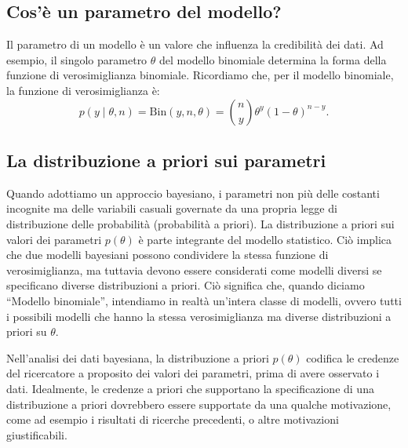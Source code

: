 \documentclass[
  11pt,
  italian,
  a4paper,
  extrafontsizes,onecolumn,openright
  ]{memoir}
\begin{document}
\hypertarget{cosuxe8-un-parametro-del-modello}{%
\subsection{Cos'è un parametro del modello?}\label{cosuxe8-un-parametro-del-modello}}

Il parametro di un modello è un valore che influenza la credibilità dei dati. Ad esempio, il singolo parametro \(\theta\) del modello binomiale determina la forma della funzione di verosimiglianza binomiale. Ricordiamo che, per il modello binomiale, la funzione di verosimiglianza è:
\[
p(y \mid \theta, n) = \text{Bin}(y, n, \theta) = \binom{n}{y}\theta^y(1-\theta)^{n-y}.
\]

\hypertarget{la-distribuzione-a-priori-sui-parametri}{%
\subsection{La distribuzione a priori sui parametri}\label{la-distribuzione-a-priori-sui-parametri}}

Quando adottiamo un approccio bayesiano, i parametri non più delle costanti incognite ma delle variabili casuali governate da una propria legge di distribuzione delle probabilità (probabilità a priori). La distribuzione a priori sui valori dei parametri \(p(\theta)\) è parte integrante del modello statistico. Ciò implica che due modelli bayesiani possono condividere la stessa funzione di verosimiglianza, ma tuttavia devono essere considerati come modelli diversi se specificano diverse distribuzioni a priori. Ciò significa che, quando diciamo ``Modello binomiale'', intendiamo in realtà un'intera classe di modelli, ovvero tutti i possibili modelli che hanno la stessa verosimiglianza ma diverse distribuzioni a priori su \(\theta\).

Nell'analisi dei dati bayesiana, la distribuzione a priori \(p(\theta)\) codifica le credenze del ricercatore a proposito dei valori dei parametri, prima di avere osservato i dati. Idealmente, le credenze a priori che supportano la specificazione di una distribuzione a priori dovrebbero essere supportate da una qualche motivazione, come ad esempio i risultati di ricerche precedenti, o altre motivazioni giustificabili.
\end{document}
